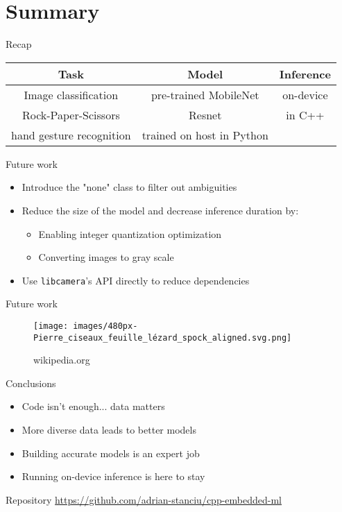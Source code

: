 
\section{Summary}

\begin{frame}{Recap}
  \begin{table}
	\begin{tabular}{|c|c|c|}
	  \hline
		\textbf{Task} & \textbf{Model} & \textbf{Inference} \\
	  \hline
		\multicolumn{1}{|c|}{Image classification} &
		pre-trained MobileNet & on-device \\
	  \cline{1-2}
		\multicolumn{1}{|c|}{Rock-Paper-Scissors} & Resnet & in C++ \\
		\multicolumn{1}{|c|}{hand gesture recognition} & trained on host in Python & \\
	  \hline
	\end{tabular}
  \end{table}
\end{frame}

\begin{frame}{Future work}
  \begin{itemize}
	\item Introduce the "none" class to filter out ambiguities
	\item Reduce the size of the model and decrease inference duration by:
	  \begin{itemize}
		\item Enabling integer quantization optimization
		\item Converting images to gray scale
	  \end{itemize}
	\item Use \texttt{libcamera}'s API directly to reduce dependencies
  \end{itemize}
\end{frame}

\begin{frame}{Future work}
  \begin{figure}
	\texttt{[image: images/480px-Pierre\_ciseaux\_feuille\_lézard\_spock\_aligned.svg.png]}
	\caption{wikipedia.org}
  \end{figure}
\end{frame}

\begin{frame}{Conclusions}
  \begin{itemize}
	\item Code isn't enough... data matters
	\item More diverse data leads to better models
	\item Building accurate models is an expert job
	\item Running on-device inference is here to stay
  \end{itemize}
\end{frame}

\begin{frame}{Repository}
  \url{https://github.com/adrian-stanciu/cpp-embedded-ml}
\end{frame}

